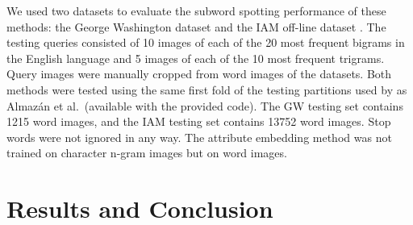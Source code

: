 \documentclass[conference]{IEEEtran}
\begin{document}
We used two datasets to evaluate the subword spotting performance of these methods: the George Washington dataset \cite{GW} and the IAM off-line dataset \cite{IAM}. The testing queries consisted of 10 images of each of the 20 most frequent bigrams in the English language and 5 images of each of the 10 most frequent trigrams. Query images were manually cropped from word images of the datasets. 
Both methods were tested using the same first fold of the testing partitions used by as Almaz\'{a}n et al.~(available with the provided code).
The GW testing set contains 1215 word images, and the IAM testing set contains 13752 word images. Stop words were not ignored in any way. The attribute embedding method was not trained on character n-gram images but on word images.


\section{Results and Conclusion}

\end{document}
